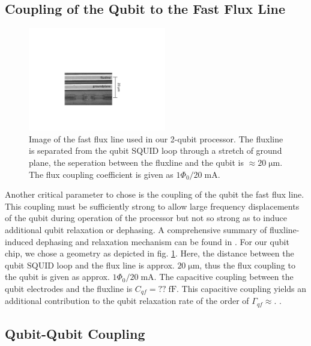 \subsection{Coupling of the Qubit to the Fast Flux Line}

\begin{figure}
\centering
	\includegraphics[width=6cm]{"./material/figures/2-qubit-processor/fluxline design"}
	\caption[]{Image of the fast flux line used in our 2-qubit processor. The fluxline is separated from the qubit SQUID loop through a stretch of ground plane, the seperation between the fluxline and the qubit is $\approx 20\;\mathrm{\mu m}$. The flux coupling coefficient is given as $1\Phi_0/20\;\mathrm{mA}$.}
	\label{fig:fluxline_design}
\end{figure}

Another critical parameter to chose is the coupling of the qubit the fast flux line. This coupling must be sufficiently strong to allow large frequency displacements of the qubit during operation of the processor but not so strong as to induce additional qubit relaxation or dephasing. A comprehensive summary of fluxline-induced dephasing and relaxation mechanism can be found in \cite{koch_charge-insensitive_2007}. For our qubit chip, we chose a geometry as depicted in fig. \ref{fig:fluxline_design}. Here, the distance between the qubit SQUID loop and the flux line is approx. $20\;\mathrm{\mu m}$, thus the flux coupling to the qubit is given as approx. $1 \Phi_0 / 20\;\mathrm{mA}$. The capacitive coupling between the qubit electrodes and the fluxline is $C_{qf}=??\;\mathrm{fF}$. This capacitive coupling yields an additional contribution to the qubit relaxation rate of the order of $\Gamma_{qf}\approx$. .

\subsection{Qubit-Qubit Coupling}

